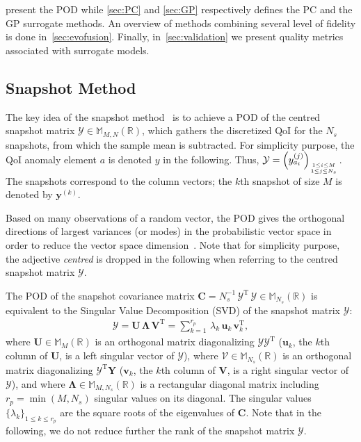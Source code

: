 present the POD while \cref{sec:PC} and \cref{sec:GP} respectively defines the PC and the GP surrogate methods. An overview of methods combining several level of fidelity is done in~\cref{sec:evofusion}. Finally, in~\cref{sec:validation} we present quality metrics associated with surrogate models.

\subsection{Snapshot Method}\label{sec:POD}


The key idea of the snapshot method~\citep{sirovich1987} is to achieve a POD of the centred snapshot matrix $\mathcal{Y} \in \mathbb{M}_{M,N}(\mathbb{R})$, which gathers the discretized QoI for the $N_{s}$ snapshots, from which the sample mean is subtracted. For simplicity purpose, the QoI anomaly element $a$ is denoted $y$ in the following. Thus, $\mathcal{Y} = \left(y_{a_i}^{(j)}\right)_{1\leq i \leq M \atop 1\leq j \leq N_{s}}$. The snapshots correspond to the column vectors; the $k$th snapshot of size $M$ is denoted by $\mathbf{y}^{(k)}$.

Based on many observations of a random vector, the POD gives the orthogonal directions of largest variances (or modes) in the probabilistic vector space in order to reduce the vector space dimension~\citep{chatterjee2000}. Note that for simplicity purpose, the adjective {\it centred} is dropped in the following when referring to the centred snapshot matrix $\mathcal{Y}$.

The POD of the snapshot covariance matrix $\mathbf{C} = N_{s}^{-1}\,\mathcal{Y}^{\mathrm{T}}\,\mathcal{Y}\in \mathbb{M}_{N_{s}}(\mathbb{R})$ is equivalent to the Singular Value Decomposition (SVD) of the snapshot matrix $\mathcal{Y}$:
\begin{align}
\mathcal{Y} = \mathbf{U}\,\mathbf{\Lambda}\,\mathbf{V}^{\mathrm{T}} = \displaystyle\sum_{k = 1}^{r_{p}}\,\lambda_k\,\mathbf{u}_k\,\mathbf{v}_k^{\mathrm{T}},
\end{align} 
where $\mathbf{U} \in \mathbb{M}_M(\mathbb{R})$ is an orthogonal matrix diagonalizing $\mathcal{Y}\mathcal{Y}^{\mathrm{T}}$ ($\mathbf{u}_k$, the $k$th column of $\mathbf{U}$, is a left singular vector of $\mathcal{Y}$), where $\mathcal{V} \in \mathbb{M}_{N_{s}}(\mathbb{R})$ is an orthogonal matrix diagonalizing $\mathcal{Y}^{\mathrm{T}}\mathbf{Y}$ ($\mathbf{v}_k$, the $k$th column of $\mathbf{V}$, is a right singular vector of $\mathcal{Y}$), and where $\mathbf{\Lambda} \in \mathbb{M}_{M,N_{s}}(\mathbb{R})$ is a rectangular diagonal matrix including $r_{p}=\min(M,N_{s})$ singular values on its diagonal. The singular values $\lbrace \lambda_k \rbrace_{1 \leq k \leq r_{p}}$ are the square roots of the eigenvalues of $\mathbf{C}$. 
Note that in the following, we do not reduce further the rank of the snapshot matrix $\mathcal{Y}$. 

